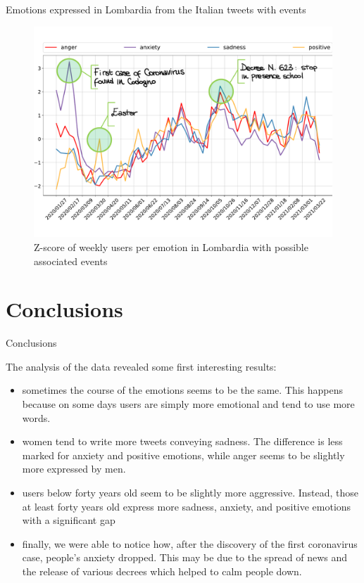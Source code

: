 \documentclass[9pt,aspectratio=1610]{beamer}  %
\begin{document}
\begin{frame}{Emotions expressed in Lombardia from the Italian tweets with events}
    
    \begin{figure}[H]
    	\centering
    	\includegraphics[scale=.4]{assets/img/it_4_categories_lombardia_events.svg.pdf}
    	\vspace*{-.75cm}
    	\caption{Z-score of weekly users per emotion in Lombardia with possible associated events}
    	\label{fig:it-4-categories-lombardia-std-events}
    \end{figure}

\end{frame}

\section{Conclusions}

\begin{frame}{Conclusions}
    
    The analysis of the data revealed some first interesting results:

    \begin{itemize}
    	\item sometimes the course of the emotions seems to be the same. This happens because on some days users are simply more emotional and tend to use more words.
    	\item women tend to write more tweets conveying sadness. The difference is less marked for anxiety and positive emotions, while anger seems to be slightly more expressed by men.
    	\item users below forty years old seem to be slightly more aggressive. Instead, those at least forty years old express more sadness, anxiety, and positive emotions with a significant gap
    	\item finally, we were able to notice how, after the discovery of the first coronavirus case, people's anxiety dropped. This may be due to the spread of news and the release of various decrees which helped to calm people down.
    \end{itemize}
    
\end{frame}
\end{document}
